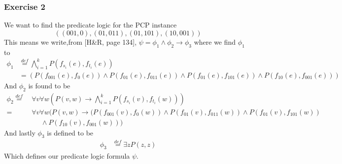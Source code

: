 \documentclass[12pt]{article}
\begin{document}
\subsubsection*{Exercise 2}
We want to find the predicate logic for the PCP instance
$$((001,0),(01,011),(01,101),(10,001))$$
This means we write,from [H\&R, page 134], $\psi=\phi_1\land\phi_2\to \phi_3$ where we find $\phi_1$ to
\begin{align*}
\phi_1 &\stackrel{def}{=}\bigwedge_{i=1}^{k} P(f_{s_i}(e),f_{t_i}(e)) \\
&=(P(f_{001}(e),f_0(e))\land P(f_{01}(e),f_{011}(e))\land P(f_{01}(e),f_{101}(e))\land P(f_{10}(e),f_{001}(e)))
\end{align*}
And $\phi_2$ is found to be
\begin{align*}
\phi_2 \stackrel{def}{=} \:&\forall v\forall w(P(v,w)\to \bigwedge_{i=1}^{k} P(f_{s_i}(v),f_{t_i}(w))) \\
=\:&\forall v\forall w(P(v,w)\to (P(f_{001}(v),f_0(w))\land P(f_{01}(v),f_{011}(w))\land P(f_{01}(v),f_{101}(w))\\
&\phantom{=} \land P(f_{10}(v),f_{001}(w)))
\end{align*}
And lastly $\phi_3$ is defined to be
\begin{align*}
\phi_3 &\stackrel{def}{=} \exists zP(z,z)
\end{align*}
Which defines our predicate logic formula $\psi$.
\end{document}

